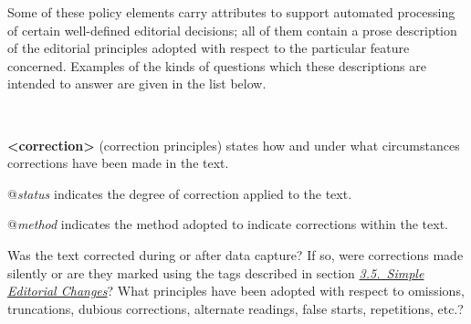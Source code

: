 Some of these policy elements carry attributes to support automated processing of certain well-defined editorial decisions; all of them contain a prose description of the editorial principles adopted with respect to the particular feature concerned. Examples of the kinds of questions which these descriptions are intended to answer are given in the list below.\begin{description}

\item[{\hyperlink{TEI.correction}{}}]\hspace{1em}\hfill\linebreak
\mbox{}\\[-10pt] 
\begin{sansreflist}
  
\item [\textbf{<correction>}] (correction principles) states how and under what circumstances corrections have been made in the text.\hfil\\[-10pt]\begin{sansreflist}
    \item[@{\itshape status}]
  indicates the degree of correction applied to the text.
    \item[@{\itshape method}]
  indicates the method adopted to indicate corrections within the text.
\end{sansreflist}  
\end{sansreflist}
 \par
Was the text corrected during or after data capture? If so, were corrections made silently or are they marked using the tags described in section \textit{\hyperref[COED]{3.5.\ Simple Editorial Changes}}? What principles have been adopted with respect to omissions, truncations, dubious corrections, alternate readings, false starts, repetitions, etc.?
\item[{\hyperlink{TEI.normalization}{}}]\hspace{1em}\hfill\linebreak
\mbox{}\\[-10pt] 
\begin{sansreflist}
  

\end{sansreflist}
\end{description}
